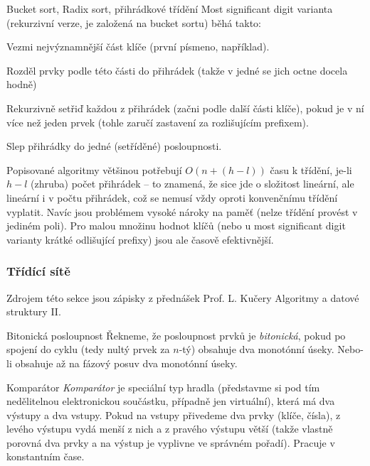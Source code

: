 \begin{algoritmusN}{Bucket sort, Radix sort, přihrádkové třídění}
Most significant digit varianta (rekurzivní verze, je založená na bucket sortu) běhá takto:
\begin{penumerate}
    \item Vezmi nejvýznamnější část klíče (první písmeno, například).
    \item Rozděl prvky podle této části do přihrádek (takže v jedné se jich octne docela hodně)
    \item Rekurzivně setřiď každou z přihrádek (začni podle další části klíče), pokud je v ní více než jeden prvek (tohle zaručí zastavení za rozlišujícím prefixem).
    \item Slep přihrádky do jedné (setříděné) posloupnosti.
\end{penumerate}

Popisované algoritmy většinou potřebují $O(n+(h-l))$ času k třídění, je-li $h-l$ (zhruba) počet přihrádek -- to znamená, že sice jde o složitost lineární, ale lineární i v počtu přihrádek, což se nemusí vždy oproti konvenčnímu třídění vyplatit. Navíc jsou problémem vysoké nároky na paměť (nelze třídění provést  v jediném poli). Pro malou množinu hodnot klíčů (nebo u most significant digit varianty krátké odlišující prefixy) jsou ale časově efektivnější.
\end{algoritmusN}



\subsubsection*{Třídící sítě}

Zdrojem této sekce jsou zápisky z přednášek Prof. L. Kučery Algoritmy a datové struktury II.
\bigskip

\begin{definiceN}{Bitonická posloupnost}
Řekneme, že posloupnost prvků je \emph{bitonická}, pokud po spojení do cyklu (tedy nultý prvek za $n$-tý) obsahuje dva monotónní úseky. Nebo-li obsahuje až na fázový posuv dva monotónní úseky.
\end{definiceN}

\begin{definiceN}{Komparátor}
\emph{Komparátor} je speciální typ hradla (představme si pod tím nedělitelnou elektronickou součástku, případně jen virtuální), která má dva výstupy a dva vstupy. Pokud na vstupy přivedeme dva prvky (klíče, čísla), z levého výstupu vydá menší z nich a z pravého výstupu větší (takže vlastně porovná dva prvky a na výstup je vyplivne ve správném pořadí). Pracuje v konstantním čase.
\end{definiceN}

